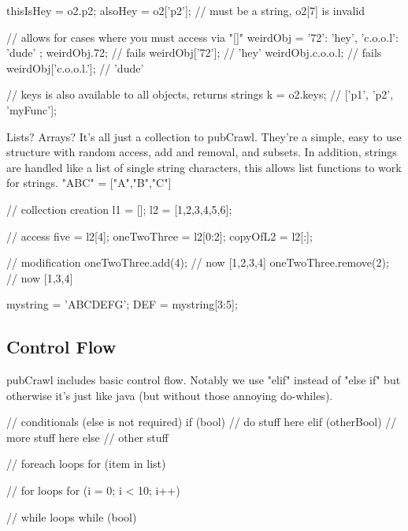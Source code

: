 \documentclass[letterpaper]{article}
\begin{document}
\begin{mdframed}[hidealllines=true,backgroundcolor=gray!10,skipbelow=1em,skipabove=.5em]
\begin{code}
thisIsHey = o2.p2;
alsoHey = o2['p2']; // must be a string, o2[7] is invalid

// allows for cases where you must access via "[]"
weirdObj = {
	'72': 'hey',
    'c.o.o.l': 'dude'
};
weirdObj.72; // fails
weirdObj['72']; // 'hey'
weirdObj.c.o.o.l; // fails
weirdObj['c.o.o.l.']; // 'dude'

// keys is also available to all objects, returns strings
k = o2.keys; // ['p1', 'p2', 'myFunc'];
\end{code}
\end{mdframed}
Lists? Arrays? It's all just a collection to pubCrawl. They're a simple, easy to use structure with random access, add and removal, and subsets. In addition, strings are handled like a list of single string characters, this allows list functions to work for strings. "ABC" = ["A","B","C"]
\begin{mdframed}[hidealllines=true,backgroundcolor=gray!10,skipbelow=1em,skipabove=.5em]
\begin{code}
// collection creation
l1 = [];
l2 = [1,2,3,4,5,6];

// access
five = l2[4];
oneTwoThree = l2[0:2];
copyOfL2 = l2[:];

// modification
oneTwoThree.add(4); // now [1,2,3,4]
oneTwoThree.remove(2); // now [1,3,4]

mystring = 'ABCDEFG';
DEF = mystring[3:5];
\end{code}
\end{mdframed}
\subsection{Control Flow}
pubCrawl includes basic control flow. Notably we use "elif" instead of "else if" but otherwise it's just like java (but without those annoying do-whiles).

\begin{mdframed}[hidealllines=true,backgroundcolor=gray!10,skipbelow=1em,skipabove=.5em]
\begin{code}
// conditionals (else is not required)
if (bool) {
// do stuff here
}
elif (otherBool) {
// more stuff here
}
else {
// other stuff
}

// foreach loops
for (item in list) {

}

// for loops
for (i = 0; i < 10; i++) {

}

// while loops
while (bool) {

}
\end{code}
\end{mdframed}
\end{document}
